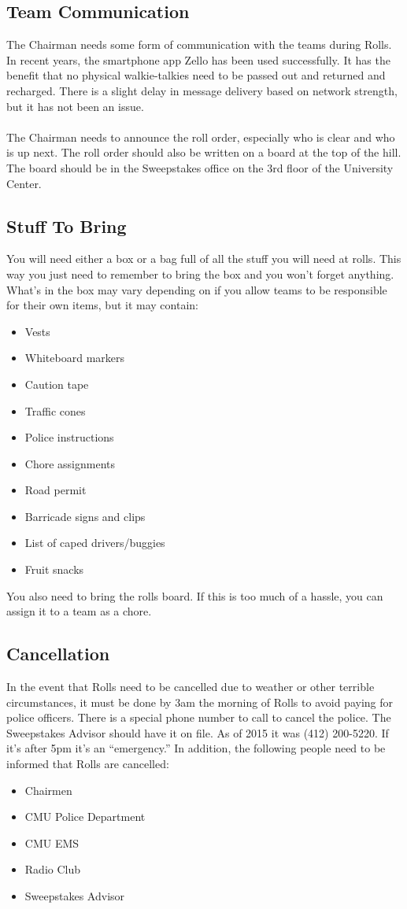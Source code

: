 \subsection{Team Communication}
The Chairman needs some form of communication with the teams during Rolls.
In recent years, the smartphone app Zello has been used successfully. It has
the benefit that no physical walkie-talkies need to be passed out and returned
and recharged. There is a slight delay in message delivery based on network
strength, but it has not been an issue.
\\\\
The Chairman needs to announce the roll order, especially who is clear and
who is up next. The roll order should also be written on a board at the top
of the hill. The board should be in the Sweepstakes office on the 3rd floor
of the University Center.

\subsection{Stuff To Bring}
You will need either a box or a bag full of all the stuff you will need at
rolls. This way you just need to remember to bring the box and you won't
forget anything. What's in the box may vary depending on if you allow teams
to be responsible for their own items, but it may contain:
\begin{itemize}
\item Vests
\item Whiteboard markers
\item Caution tape
\item Traffic cones
\item Police instructions
\item Chore assignments
\item Road permit
\item Barricade signs and clips
\item List of caped drivers/buggies
\item Fruit snacks
\end{itemize}
You also need to bring the rolls board. If this is too much of a hassle,
you can assign it to a team as a chore.

\subsection{Cancellation}
In the event that Rolls need to be cancelled due to weather or other terrible
circumstances, it must be done by 3am the morning of Rolls to avoid paying
for police officers. There is a special phone number to call to cancel the
police. The Sweepstakes Advisor should have it on file. As of 2015 it was
(412) 200-5220. If it's after 5pm it's an ``emergency.''
In addition, the following people need to be informed that Rolls are cancelled:
\begin{itemize}
\item Chairmen
\item CMU Police Department
\item CMU EMS
\item Radio Club
\item Sweepstakes Advisor
\end{itemize}

